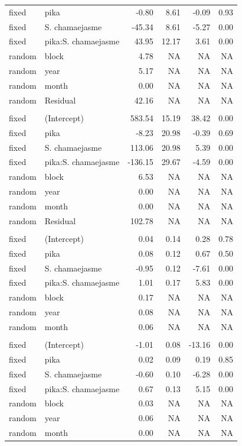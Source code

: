 \documentclass[
  letterpaper,
  DIV=11,
  numbers=noendperiod]{scrartcl}
\begin{document}
\begin{supptbl}
{\begin{table}
\begin{tabular*}{\linewidth}{@{\extracolsep{\fill}}llrrrr}
fixed & pika & -0.80 & 8.61 & -0.09 & 0.93 \\ 
fixed & S. chamaejasme & -45.34 & 8.61 & -5.27 & 0.00 \\ 
fixed & pika:S. chamaejasme & 43.95 & 12.17 & 3.61 & 0.00 \\ 
random & block & 4.78 & NA & NA & NA \\ 
random & year & 5.17 & NA & NA & NA \\ 
random & month & 0.00 & NA & NA & NA \\ 
random & Residual & 42.16 & NA & NA & NA \\ 
\midrule\addlinespace[2.5pt]
\multicolumn{6}{l}{total steps} \\[2.5pt] 
\midrule\addlinespace[2.5pt]
fixed & (Intercept) & 583.54 & 15.19 & 38.42 & 0.00 \\ 
fixed & pika & -8.23 & 20.98 & -0.39 & 0.69 \\ 
fixed & S. chamaejasme & 113.06 & 20.98 & 5.39 & 0.00 \\ 
fixed & pika:S. chamaejasme & -136.15 & 29.67 & -4.59 & 0.00 \\ 
random & block & 6.53 & NA & NA & NA \\ 
random & year & 0.00 & NA & NA & NA \\ 
random & month & 0.00 & NA & NA & NA \\ 
random & Residual & 102.78 & NA & NA & NA \\ 
\midrule\addlinespace[2.5pt]
\multicolumn{6}{l}{sedges bite steps} \\[2.5pt] 
\midrule\addlinespace[2.5pt]
fixed & (Intercept) & 0.04 & 0.14 & 0.28 & 0.78 \\ 
fixed & pika & 0.08 & 0.12 & 0.67 & 0.50 \\ 
fixed & S. chamaejasme & -0.95 & 0.12 & -7.61 & 0.00 \\ 
fixed & pika:S. chamaejasme & 1.01 & 0.17 & 5.83 & 0.00 \\ 
random & block & 0.17 & NA & NA & NA \\ 
random & year & 0.08 & NA & NA & NA \\ 
random & month & 0.06 & NA & NA & NA \\ 
\midrule\addlinespace[2.5pt]
\multicolumn{6}{l}{grass bite steps} \\[2.5pt] 
\midrule\addlinespace[2.5pt]
fixed & (Intercept) & -1.01 & 0.08 & -13.16 & 0.00 \\ 
fixed & pika & 0.02 & 0.09 & 0.19 & 0.85 \\ 
fixed & S. chamaejasme & -0.60 & 0.10 & -6.28 & 0.00 \\ 
fixed & pika:S. chamaejasme & 0.67 & 0.13 & 5.15 & 0.00 \\ 
random & block & 0.03 & NA & NA & NA \\ 
random & year & 0.06 & NA & NA & NA \\ 
random & month & 0.00 & NA & NA & NA \\ 
\bottomrule
\end{tabular*}
\end{table}

}
\end{supptbl}
\end{document}
